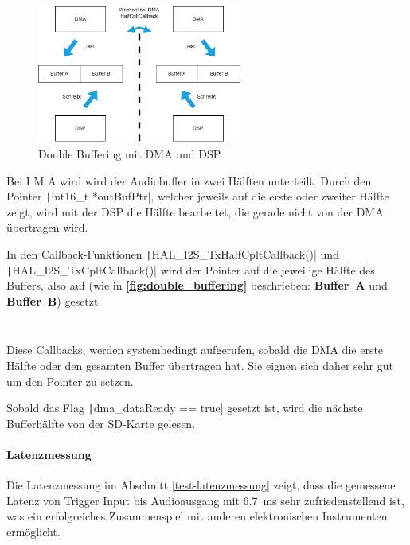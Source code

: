\begin{figure}[H]
	\centering
	\includegraphics[width=0.6\textwidth]{images/08_durchfuehrung/audio/double_buffering.drawio.png}
	\caption{Double Buffering mit DMA und DSP}
	\label{fig:double_buffering}
\end{figure}


Bei I M A wird wird der Audiobuffer in zwei Hälften unterteilt.
Durch den Pointer \texttt|int16_t *outBufPtr|, welcher jeweils auf die erste oder zweiter Hälfte zeigt, wird mit der DSP die Hälfte bearbeitet, die gerade nicht von der DMA übertragen wird.

In den Callback-Funktionen \texttt|HAL_I2S_TxHalfCpltCallback()| und \texttt|HAL_I2S_TxCpltCallback()| wird der Pointer auf die jeweilige Hälfte des Buffers, also auf (wie in  \textbf{\autoref{fig:double_buffering}} beschrieben:
\textbf{Buffer~A} und \textbf{Buffer~B}) gesetzt.


\inputminted[firstline=28, lastline=31]{c}{../../f401_sd_card_audio_codec_test/Core/Src/audio.c}

\inputminted[firstline=40, lastline=43]{c}{../../f401_sd_card_audio_codec_test/Core/Src/audio.c}


Diese Callbacks, werden systembedingt aufgerufen, sobald die DMA die erste Hälfte oder den gesamten Buffer übertragen hat. Sie eignen sich daher sehr gut um den Pointer zu setzen.

Sobald das Flag \texttt|dma_dataReady == true| gesetzt ist, wird die nächste Bufferhälfte von der SD-Karte gelesen.

\paragraph{Latenzmessung}

Die Latenzmessung im Abschnitt \ref{test-latenzmessung} zeigt, dass die gemessene Latenz von Trigger Input bis Audioausgang mit \SI{6.7}{\milli\second} sehr zufriedenstellend ist, was ein erfolgreiches Zusammenspiel mit anderen elektronischen Instrumenten ermöglicht.


